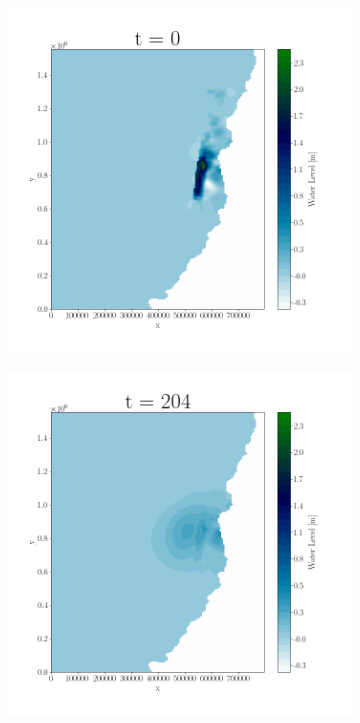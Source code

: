 
\begin{figure}[H]
\centering
\begin{subfigure}[b]{.4\linewidth}
\includegraphics[width=\linewidth]{Figures/3-1.png}
\caption{}
\end{subfigure}
\begin{subfigure}[b]{.4\linewidth}
\includegraphics[width=\linewidth]{Figures/3-2.png}
\caption{}
\end{subfigure}


\end{figure}
